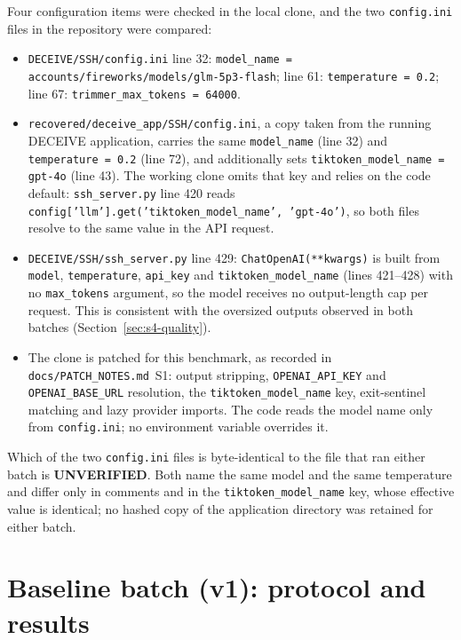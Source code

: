\documentclass[a4paper,11pt]{article}
\begin{document}
Four configuration items were checked in the local clone, and the two
\texttt{config.ini} files in the repository were compared:
\begin{itemize}[leftmargin=*]
\item \texttt{DECEIVE/SSH/config.ini} line 32: \texttt{model\_name =
  accounts/fireworks/models/glm-5p3-flash}; line 61: \texttt{temperature =
  0.2}; line 67: \texttt{trimmer\_max\_tokens = 64000}.
\item \texttt{recovered/deceive\_app/SSH/config.ini}, a copy taken from the
  running DECEIVE application, carries the same \texttt{model\_name} (line 32)
  and \texttt{temperature = 0.2} (line 72), and additionally sets
  \texttt{tiktoken\_model\_name = gpt-4o} (line 43). The working clone omits
  that key and relies on the code default: \texttt{ssh\_server.py} line 420
  reads \texttt{config['llm'].get('tiktoken\_model\_name', 'gpt-4o')}, so both
  files resolve to the same value in the API request.
\item \texttt{DECEIVE/SSH/ssh\_server.py} line 429: \texttt{ChatOpenAI(**kwargs)}
  is built from \texttt{model}, \texttt{temperature}, \texttt{api\_key} and
  \texttt{tiktoken\_model\_name} (lines 421--428) with no \texttt{max\_tokens}
  argument, so the model receives no output-length cap per request. This is
  consistent with the oversized outputs observed in both batches
  (Section~\ref{sec:s4-quality}).
\item The clone is patched for this benchmark, as recorded in
  \texttt{docs/PATCH\_NOTES.md}~S1: output stripping, \texttt{OPENAI\_API\_KEY}
  and \texttt{OPENAI\_BASE\_URL} resolution, the \texttt{tiktoken\_model\_name}
  key, exit-sentinel matching and lazy provider imports. The code reads the
  model name only from \texttt{config.ini}; no environment variable overrides
  it.
\end{itemize}

Which of the two \texttt{config.ini} files is byte-identical to the file that
ran either batch is \textbf{UNVERIFIED}. Both name the same model and the same
temperature and differ only in comments and in the
\texttt{tiktoken\_model\_name} key, whose effective value is identical; no
hashed copy of the application directory was retained for either batch.

\section{Baseline batch (v1): protocol and results}
\end{document}
